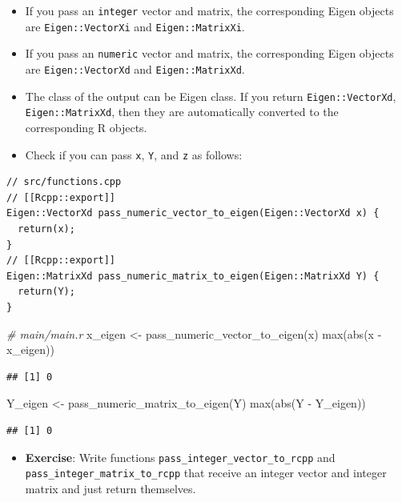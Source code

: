 \documentclass[
]{book}
\newenvironment{Shaded}{\begin{snugshade}}{\end{snugshade}}
\newcommand{\CommentTok}[1]{\textcolor[rgb]{0.56,0.35,0.01}{\textit{#1}}}
\newcommand{\FunctionTok}[1]{\textcolor[rgb]{0.00,0.00,0.00}{#1}}
\newcommand{\NormalTok}[1]{#1}
\newcommand{\OtherTok}[1]{\textcolor[rgb]{0.56,0.35,0.01}{#1}}
\newcommand{\SpecialCharTok}[1]{\textcolor[rgb]{0.00,0.00,0.00}{#1}}
\providecommand{\tightlist}{%
  \setlength{\itemsep}{0pt}\setlength{\parskip}{0pt}}
\begin{document}
\begin{itemize}
\tightlist
\item
  If you pass an \texttt{integer} vector and matrix, the corresponding Eigen objects are \texttt{Eigen::VectorXi} and \texttt{Eigen::MatrixXi}.
\item
  If you pass an \texttt{numeric} vector and matrix, the corresponding Eigen objects are \texttt{Eigen::VectorXd} and \texttt{Eigen::MatrixXd}.
\item
  The class of the output can be Eigen class. If you return \texttt{Eigen::VectorXd}, \texttt{Eigen::MatrixXd}, then they are automatically converted to the corresponding R objects.
\item
  Check if you can pass \texttt{x}, \texttt{Y}, and \texttt{z} as follows:
\end{itemize}

\begin{verbatim}
// src/functions.cpp
// [[Rcpp::export]]
Eigen::VectorXd pass_numeric_vector_to_eigen(Eigen::VectorXd x) {
  return(x);
}
// [[Rcpp::export]]
Eigen::MatrixXd pass_numeric_matrix_to_eigen(Eigen::MatrixXd Y) {
  return(Y);
}
\end{verbatim}

\begin{Shaded}
\begin{Highlighting}[]
\CommentTok{\# main/main.r}
\NormalTok{x\_eigen }\OtherTok{\textless{}{-}} \FunctionTok{pass\_numeric\_vector\_to\_eigen}\NormalTok{(x)}
\FunctionTok{max}\NormalTok{(}\FunctionTok{abs}\NormalTok{(x }\SpecialCharTok{{-}}\NormalTok{ x\_eigen))}
\end{Highlighting}
\end{Shaded}

\begin{verbatim}
## [1] 0
\end{verbatim}

\begin{Shaded}
\begin{Highlighting}[]
\NormalTok{Y\_eigen }\OtherTok{\textless{}{-}} \FunctionTok{pass\_numeric\_matrix\_to\_eigen}\NormalTok{(Y)}
\FunctionTok{max}\NormalTok{(}\FunctionTok{abs}\NormalTok{(Y }\SpecialCharTok{{-}}\NormalTok{ Y\_eigen))}
\end{Highlighting}
\end{Shaded}

\begin{verbatim}
## [1] 0
\end{verbatim}

\begin{itemize}
\tightlist
\item
  \textbf{Exercise}: Write functions \texttt{pass\_integer\_vector\_to\_rcpp} and \texttt{pass\_integer\_matrix\_to\_rcpp} that receive an integer vector and integer matrix and just return themselves.
\end{itemize}
\end{document}

